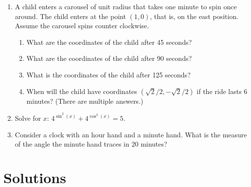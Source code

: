 \documentclass{article}
\begin{document}
\begin{enumerate}[label=\textbf{\arabic*.}, leftmargin=*, itemsep=0.6em]
    \item A child enters a carousel of unit radius that takes one minute to spin once around. The child enters at the point $(1, 0)$, that is, on the east position. Assume the carousel spins counter clockwise.
    \begin{enumerate}[leftmargin=0.8cm]
        \item What are the coordinates of the child after 45 seconds?
        \item What are the coordinates of the child after 90 seconds?
        \item What is the coordinates of the child after 125 seconds?
        \item When will the child have coordinates $(\sqrt{2}/2, -\sqrt{2}/2)$ if the ride lasts $6$ minutes? (There are multiple answers.)
    \end{enumerate}
    
    \item Solve for $x$: $4^{\sin^2(x)} + 4^{\cos^2(x)} = 5$.
    
    \item Consider a clock with an hour hand and a minute hand. What is the measure of the angle the minute hand traces in \(20\) minutes?
    
\end{enumerate}

\section*{Solutions}
\end{document}
